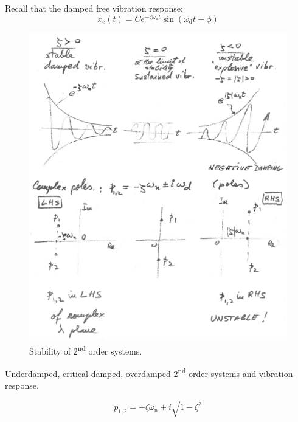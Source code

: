 \documentclass[12pt,letter]{article}
\begin{document}
Recall that the damped free vibration response:
\begin{equation}
x_\text{c}(t) = C e^{-\zeta \omega_\text{n} t} \sin (\omega_\text{d} t + \phi)
\end{equation}
\begin{figure}[H]
	\centering
	\includegraphics[width=6.5in]{../figures/stability_2nd_order.png}
	\caption{Stability of 2\textsuperscript{nd} order systems.}
\end{figure}

Underdamped, critical-damped, overdamped 2\textsuperscript{nd} order systems and vibration response. 


\begin{equation}
p_{1,2} = -\zeta \omega_\text{n} \pm i  \sqrt{1 - \zeta^2}
\end{equation}
\end{document}
